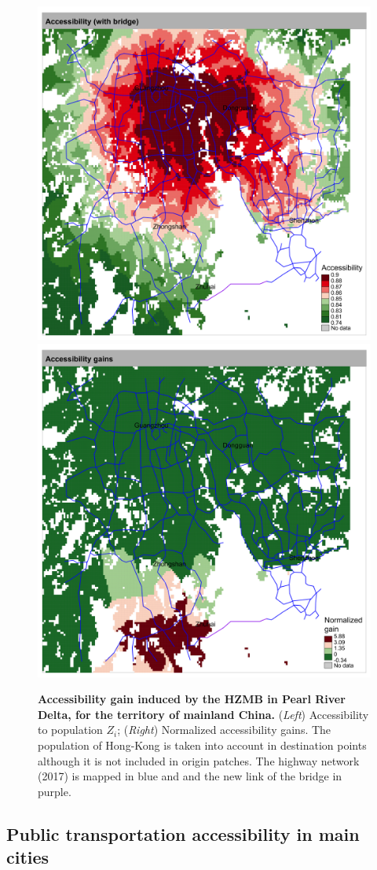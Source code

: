 \begin{figure}
	\includegraphics[width=0.49\linewidth]{figures/accessp_withbridge_prd_EN.png}
	\includegraphics[width=0.49\linewidth]{figures/accesspdiff_prd_EN.png}
	\caption{\textbf{Accessibility gain induced by the HZMB in Pearl River Delta, for the territory of mainland China.} (\textit{Left}) Accessibility to population $Z_i$; (\textit{Right}) Normalized accessibility gains. The population of Hong-Kong is taken into account in destination points although it is not included in origin patches. The highway network (2017) is mapped in blue and and the new link of the bridge in purple.\label{fig:casestudies:prd}}
\end{figure}



\subsection{Public transportation accessibility in main cities}



